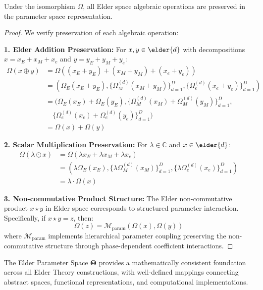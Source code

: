 \begin{corollary}
\label{cor:operation_preservation}
Under the isomorphism $\Omega$, all Elder space algebraic operations are preserved in the parameter space representation.
\end{corollary}

\begin{proof}
We verify preservation of each algebraic operation:

\textbf{1. Elder Addition Preservation:}
For $x, y \in \elder{d}$ with decompositions $x = x_E + x_M + x_e$ and $y = y_E + y_M + y_e$:
\begin{align}
\Omega(x \oplus y) &= \Omega((x_E + y_E) + (x_M + y_M) + (x_e + y_e)) \\
&= (\Omega_E(x_E + y_E), \{\Omega_M^{(d)}(x_M + y_M)\}_{d=1}^D, \{\Omega_e^{(d)}(x_e + y_e)\}_{d=1}^D) \\
&= (\Omega_E(x_E) + \Omega_E(y_E), \{\Omega_M^{(d)}(x_M) + \Omega_M^{(d)}(y_M)\}_{d=1}^D, \\
&\quad \{\Omega_e^{(d)}(x_e) + \Omega_e^{(d)}(y_e)\}_{d=1}^D) \\
&= \Omega(x) + \Omega(y)
\end{align}

\textbf{2. Scalar Multiplication Preservation:}
For $\lambda \in \mathbb{C}$ and $x \in \elder{d}$:
\begin{align}
\Omega(\lambda \odot x) &= \Omega(\lambda x_E + \lambda x_M + \lambda x_e) \\
&= (\lambda \Omega_E(x_E), \{\lambda \Omega_M^{(d)}(x_M)\}_{d=1}^D, \{\lambda \Omega_e^{(d)}(x_e)\}_{d=1}^D) \\
&= \lambda \cdot \Omega(x)
\end{align}

\textbf{3. Non-commutative Product Structure:}
The Elder non-commutative product $x \star y$ in Elder space corresponds to structured parameter interaction. Specifically, if $x \star y = z$, then:
$$\Omega(z) = \mathcal{M}_{\text{param}}(\Omega(x), \Omega(y))$$
where $\mathcal{M}_{\text{param}}$ implements hierarchical parameter coupling preserving the non-commutative structure through phase-dependent coefficient interactions.
\end{proof}

\begin{theorem}
\label{thm:parameter_coherence}
The Elder Parameter Space $\boldsymbol{\Theta}$ provides a mathematically consistent foundation across all Elder Theory constructions, with well-defined mappings connecting abstract spaces, functional representations, and computational implementations.
\end{theorem}

